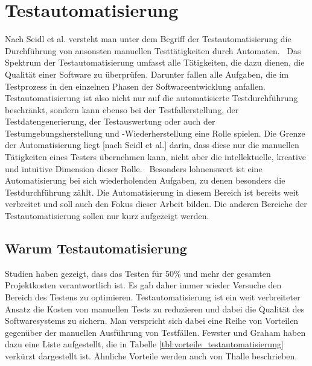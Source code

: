 \chapter{Testautomatisierung}
\label{sec:testautomatisierung}

Nach Seidl et al. versteht man unter dem Begriff der Testautomatisierung \glqq die Durchführung von ansonsten manuellen Testtätigkeiten durch Automaten.\grqq\ \cite[Seite 7]{seidl_basiswissen_2012}
Das Spektrum der Testautomatisierung umfasst alle Tätigkeiten, die dazu dienen, die Qualität einer Software zu überprüfen. Darunter fallen alle Aufgaben, die im Testprozess in den einzelnen Phasen der Softwareentwicklung anfallen.
Testautomatisierung ist also nicht nur auf die automatisierte Testdurchführung beschränkt, sondern kann ebenso bei der Testfallerstellung, der Testdatengenerierung, der Testauswertung oder auch der Testumgebungsherstellung und -Wiederherstellung eine Rolle spielen.
\glqq Die Grenze der Automatisierung liegt [nach Seidl et al.] darin, dass diese nur die manuellen Tätigkeiten eines Testers übernehmen kann, nicht aber die intellektuelle, kreative und intuitive Dimension dieser Rolle.\grqq\ \cite[Seite 7]{seidl_basiswissen_2012}
Besonders lohnenswert ist eine Automatisierung bei sich wiederholenden Aufgaben, zu denen
besonders die Testdurchführung zählt. Die Automatisierung in diesem Bereich ist bereits weit verbreitet und soll auch den Fokus dieser Arbeit bilden. Die anderen Bereiche der Testautomatisierung sollen nur kurz aufgezeigt werden.

\section{Warum Testautomatisierung}
\label{sec:warum_testautomatisierung}

Studien haben gezeigt, dass das Testen für 50\% und mehr der gesamten Projektkosten verantwortlich ist. \cite{ramler_economic_2006} 
Es gab daher immer wieder Versuche den Bereich des Testens zu optimieren. Testautomatisierung ist ein weit verbreiteter Ansatz die Kosten von manuellen Tests zu reduzieren und dabei die Qualität des Softwaresystems zu sichern. \cite{amannejad_search-based_2014} Man verspricht sich dabei eine Reihe von Vorteilen gegenüber der manuellen Ausführung von Testfällen. Fewster und Graham haben dazu eine Liste aufgestellt, die in Tabelle \ref{tbl:vorteile_testautomatisierung} verkürzt dargestellt ist.
Ähnliche Vorteile werden auch von Thalle \cite[Seite 228]{thaller_software-test_2002} beschrieben.


